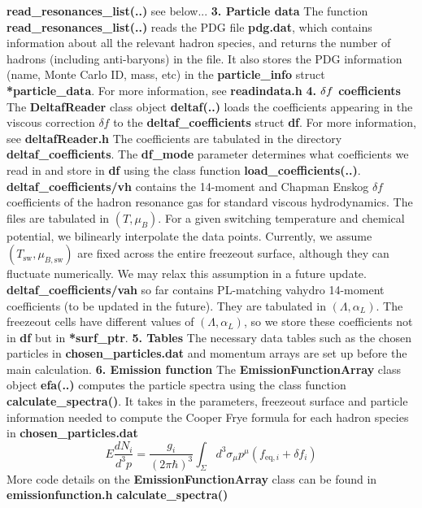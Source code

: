 \documentclass[10.5pt,aps,prd,superscriptaddress]{revtex4}
\newcommand{\be}{\begin{equation}}
\newcommand{\ee}{\end{equation}}
\newcommand{\eq}{\text{eq}}
\newcommand{\n}{\newline}
\newcommand{\nn}{\newline\newline}
\newcommand{\boldf}{\textbf}
\begin{document}
\nn
\boldf{read\_resonances\_list(..)} see below...
\nn
\nn
\boldf{3. Particle data}
\nn
The function \boldf{read\_resonances\_list(..)} reads the PDG file \boldf{pdg.dat}, which contains information about all the relevant hadron species, and returns the number of hadrons (including anti-baryons) in the file. It also stores the PDG information (name, Monte Carlo ID, mass, etc) in the \boldf{particle\_info} struct \boldf{*particle\_data}.  For more information, see \boldf{readindata.h}
\nn
\nn
\boldf{4. $\bold\delta f$ coefficients}
\nn
The \boldf{DeltafReader} class object \boldf{deltaf(..)} loads the coefficients appearing in the viscous correction $\delta f$ to the \boldf{deltaf\_coefficients} struct \boldf{df}. For more information, see \boldf{deltafReader.h}
\nn
The coefficients are tabulated in the directory \boldf{deltaf\_coefficients}. The \boldf{df\_mode} parameter determines what coefficients we read in and store in \boldf{df} using the class function \boldf{load\_coefficients(..)}.
\nn
\boldf{deltaf\_coefficients/vh} contains the 14-moment and Chapman Enskog $\delta f$ coefficients of the hadron resonance gas for standard viscous hydrodynamics. The files are tabulated in $(T,\mu_B)$. For a given switching temperature and chemical potential, we bilinearly interpolate the data points. Currently, we assume $(T_\text{sw}, \mu_{B,\text{sw}})$ are fixed across the entire freezeout surface, although they can fluctuate numerically. We may relax this assumption in a future update. 
\nn
\boldf{deltaf\_coefficients/vah} so far contains PL-matching vahydro 14-moment coefficients (to be updated in the future). They are tabulated in $(\Lambda, \alpha_L)$. The freezeout cells have different values of $(\Lambda, \alpha_L)$, so we store these coefficients not in \boldf{df} but in \boldf{*surf\_ptr}.
\nn
\nn
\boldf{5. Tables}
\nn
The necessary data tables such as the chosen particles in \boldf{chosen\_particles.dat} and momentum arrays are set up before the main calculation. 
\nn
\nn
\boldf{6. Emission function}
\nn
The \boldf{EmissionFunctionArray} class object \boldf{efa(..)} computes the particle spectra using the class function \boldf{calculate\_spectra()}. It takes in the parameters, freezeout surface and particle information needed to compute the Cooper Frye formula for each hadron species in \boldf{chosen\_particles.dat}
\be
E\frac{dN_i}{d^3 p} = \frac{g_i}{(2\pi \hbar)^3} \int_\Sigma d^3 \sigma_\mu p^\mu (f_{\eq,i} + \delta f_i)
\ee 
More code details on the \boldf{EmissionFunctionArray} class can be found in \boldf{emissionfunction.h}
\nn\n
\boldf{calculate\_spectra()}
\end{document}
